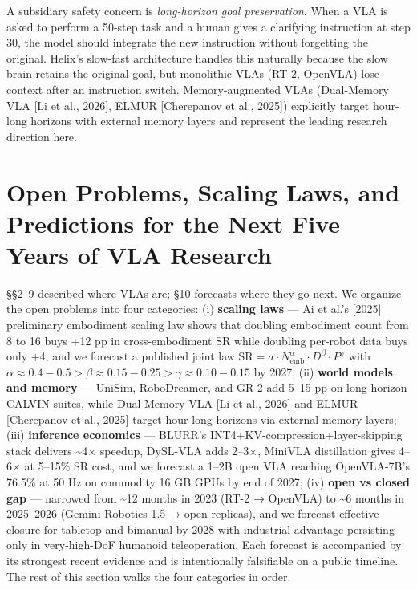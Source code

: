 A subsidiary safety concern is \emph{long-horizon goal preservation}. When a VLA is asked to perform a 50-step task and a human gives a clarifying instruction at step 30, the model should integrate the new instruction without forgetting the original. Helix's slow-fast architecture handles this naturally because the slow brain retains the original goal, but monolithic VLAs (RT-2, OpenVLA) lose context after an instruction switch. Memory-augmented VLAs (Dual-Memory VLA {[}Li et al., 2026{]}, ELMUR {[}Cherepanov et al., 2025{]}) explicitly target hour-long horizons with external memory layers and represent the leading research direction here.

\section{Open Problems, Scaling Laws, and Predictions for the Next Five Years of VLA Research}\label{open-problems-scaling-laws-and-predictions-for-the-next-five-years-of-vla-research}

§§2--9 described where VLAs are; §10 forecasts where they go next. We organize the open problems into four categories: (i) \textbf{scaling laws} --- Ai et al.'s {[}2025{]} preliminary embodiment scaling law shows that doubling embodiment count from 8 to 16 buys +12 pp in cross-embodiment SR while doubling per-robot data buys only +4, and we forecast a published joint law \(\text{SR} = a \cdot N_{\text{emb}}^{\alpha} \cdot D^{\beta} \cdot P^{\gamma}\) with \(\alpha \approx 0.4{-}0.5 > \beta \approx 0.15{-}0.25 > \gamma \approx 0.10{-}0.15\) by 2027; (ii) \textbf{world models and memory} --- UniSim, RoboDreamer, and GR-2 add 5--15 pp on long-horizon CALVIN suites, while Dual-Memory VLA {[}Li et al., 2026{]} and ELMUR {[}Cherepanov et al., 2025{]} target hour-long horizons via external memory layers; (iii) \textbf{inference economics} --- BLURR's INT4+KV-compression+layer-skipping stack delivers \textasciitilde4× speedup, DySL-VLA adds 2--3×, MiniVLA distillation gives 4--6× at 5--15\% SR cost, and we forecast a 1--2B open VLA reaching OpenVLA-7B's 76.5\% at 50 Hz on commodity 16 GB GPUs by end of 2027; (iv) \textbf{open vs closed gap} --- narrowed from \textasciitilde12 months in 2023 (RT-2 → OpenVLA) to \textasciitilde6 months in 2025--2026 (Gemini Robotics 1.5 → open replicas), and we forecast effective closure for tabletop and bimanual by 2028 with industrial advantage persisting only in very-high-DoF humanoid teleoperation. Each forecast is accompanied by its strongest recent evidence and is intentionally falsifiable on a public timeline. The rest of this section walks the four categories in order.

